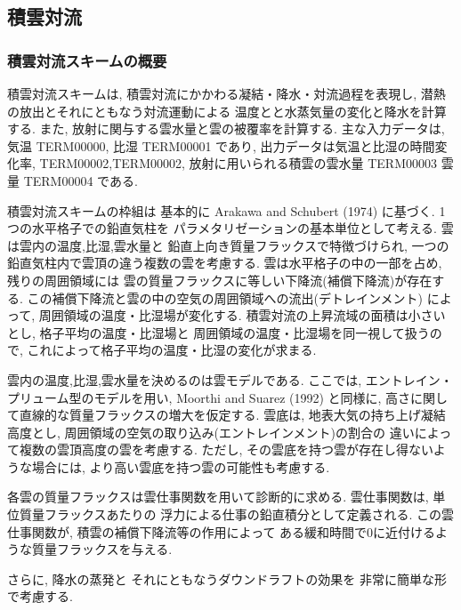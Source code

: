 ﻿
\subsection{積雲対流}

\subsubsection{積雲対流スキームの概要}

積雲対流スキームは,
積雲対流にかかわる凝結・降水・対流過程を表現し,
潜熱の放出とそれにともなう対流運動による
温度とと水蒸気量の変化と降水を計算する.
また, 放射に関与する雲水量と雲の被覆率を計算する.
主な入力データは, 気温 TERM00000, 比湿 TERM00001 であり,
出力データは気温と比湿の時間変化率,
TERM00002,TERM00002,
放射に用いられる積雲の雲水量 TERM00003 雲量 TERM00004 である.

積雲対流スキームの枠組は
基本的に Arakawa and Schubert (1974) に基づく.
1つの水平格子での鉛直気柱を
パラメタリゼーションの基本単位として考える.
雲は雲内の温度,比湿,雲水量と
鉛直上向き質量フラックスで特徴づけられ,
一つの鉛直気柱内で雲頂の違う複数の雲を考慮する.
雲は水平格子の中の一部を占め, 残りの周囲領域には
雲の質量フラックスに等しい下降流(補償下降流)が存在する.
この補償下降流と雲の中の空気の周囲領域への流出(デトレインメント)
によって, 周囲領域の温度・比湿場が変化する.
積雲対流の上昇流域の面積は小さいとし,
格子平均の温度・比湿場と
周囲領域の温度・比湿場を同一視して扱うので,
これによって格子平均の温度・比湿の変化が求まる.

雲内の温度,比湿,雲水量を決めるのは雲モデルである.
ここでは, エントレイン・プリューム型のモデルを用い,
Moorthi and Suarez (1992) と同様に,
高さに関して直線的な質量フラックスの増大を仮定する.
雲底は, 地表大気の持ち上げ凝結高度とし,
周囲領域の空気の取り込み(エントレインメント)の割合の
違いによって複数の雲頂高度の雲を考慮する.
ただし, その雲底を持つ雲が存在し得ないような場合には,
より高い雲底を持つ雲の可能性も考慮する.

各雲の質量フラックスは雲仕事関数を用いて診断的に求める.
雲仕事関数は, 単位質量フラックスあたりの
浮力による仕事の鉛直積分として定義される.
この雲仕事関数が, 積雲の補償下降流等の作用によって
ある緩和時間で0に近付けるような質量フラックスを与える.

さらに, 降水の蒸発と
それにともなうダウンドラフトの効果を
非常に簡単な形で考慮する.

